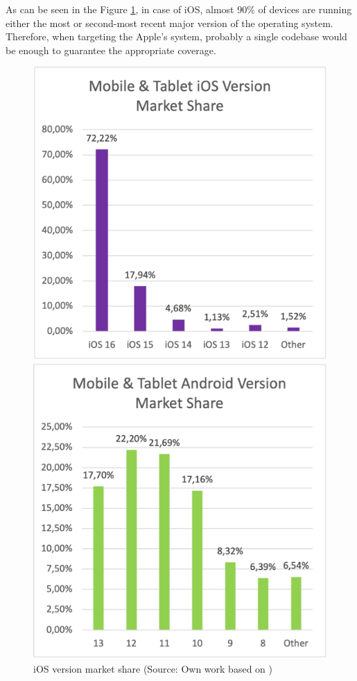 As can be seen in the Figure \ref{fig:ios_versions}, in case of iOS, almost 90\% of devices are running either the most or second-most recent major version of the operating system. Therefore, when targeting the Apple's system, probably a single codebase would be enough to guarantee the appropriate coverage.

\begin{figure}[H]
  \begin{minipage}{.47\textwidth}
    \includegraphics[width=\textwidth]{img/ios_ver_market_share}
    \caption{iOS version market share (Source: Own work based on \cite{statcounter_ios_version_market})}
    \label{fig:ios_versions}
  \end{minipage}
  \hfill
  \begin{minipage}{.47\textwidth}
    \includegraphics[width=\textwidth]{img/android_ver_market_share}

\end{minipage}
\end{figure}
